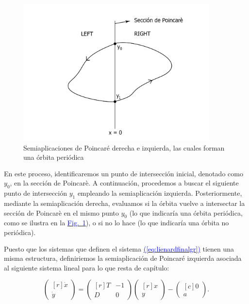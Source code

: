 \documentclass[12pt,a4paper]{report} %
\newcommand{\fref}[1]{\hyperref[#1]{\textcolor{blue}{Fig.~\ref*{#1}}}}
\newcommand{\eref}[1]{\hyperref[#1]{\textcolor{blue}{(\ref*{#1})}}}
\newcommand{\fref}[1]{\hyperref[#1]{\textcolor{blue}{\textit{Fig.~\ref*{#1}}}}}
\newcommand{\eref}[1]{\hyperref[#1]{\textcolor{blue}{\textit{(\ref*{#1})}}}}
\begin{document}
	\begin{figure}[h]
		\centering
		\includegraphics[width=0.9\textwidth]{poincaLR.jpg}
		\caption{Semiaplicaciones de Poincaré derecha e izquierda, las cuales forman una órbita periódica}
		\label{fig:poincaLR}
	\end{figure}\smallskip
	
	En este proceso, identificaremos un punto de intersección inicial, denotado como $y_0$, en la sección de Poincarè. A continuación, procedemos a buscar el siguiente punto de intersección $y_1$ empleando la semiaplicación izquierda. Posteriormente, mediante la semiaplicación derecha, evaluamos si la órbita vuelve a intersectar la sección de Poincarè en el mismo punto $y_0$ (lo que indicaría una órbita periódica, como se ilustra en la \fref{fig:poincaLR}), o si no lo hace (lo que indicaría una órbita no periódica).
	
	\vspace{0.5cm} Puesto que los sistemas que definen el sistema \eref{eq:lienardfinalgr} tienen una misma estructura, definiriemos la semiaplicación de Poincaré izquierda asociada al siguiente sistema lineal para lo que resta de capítulo:
	
		\begin{equation}
		\label{eq:lienardsolo}
		\begin{pmatrix*}[r]
			\dot{x}\\ \dot{y}
		\end{pmatrix*}= \begin{pmatrix*}[r]
			T & -1 \\ D & 0
		\end{pmatrix*} \begin{pmatrix*}[r]
			x \\ y
		\end{pmatrix*}-\begin{pmatrix*}[c]
			0 \\ a
		\end{pmatrix*}.
	\end{equation}\smallskip
	
\end{document}
